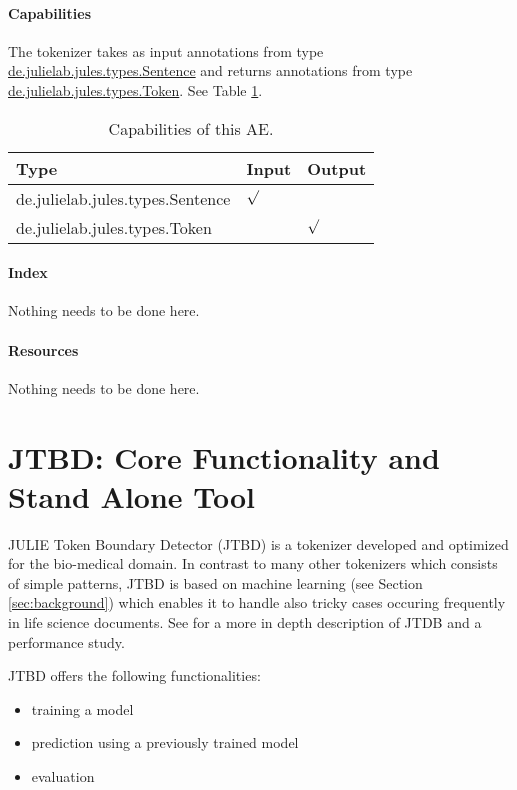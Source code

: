 \documentclass[11pt,a4paper,halfparskip]{scrartcl}
\begin{document}
\paragraph{Capabilities}
\label{sss:capabilities}
The tokenizer takes as input annotations from type \url{de.julielab.jules.types.Sentence} and returns annotations from type \url{de.julielab.jules.types.Token}. See Table \ref{tab:capabilities}.
\begin{table}[h!]
  \centering
  \begin{tabular}{|p{5cm}|p{2cm}|p{2cm}|}
    \hline
    Type & Input & Output \\
    \hline\hline
     de.julielab.jules.types.Sentence & $\surd$ & \\
      \hline
     de.julielab.jules.types.Token & &  $\surd$  \\
      \hline
  \end{tabular}
  \caption{Capabilities of this AE.}
  \label{tab:capabilities}
\end{table} 


\paragraph{Index}
Nothing needs to be done here.

\paragraph{Resources}
Nothing needs to be done here.



\clearpage
\section{JTBD: Core Functionality and Stand Alone Tool}
\label{sec_objective}


JULIE Token Boundary Detector (JTBD) is a tokenizer developed and
optimized for the bio-medical domain. In contrast to many other
tokenizers which consists of simple patterns, JTBD is based on machine
learning (see Section \ref{sec:background}) which enables it to handle
also tricky cases occuring frequently in life science documents. See
\cite{tomanek.medinfo07} for a more in depth description of JTDB and a
performance study.


JTBD offers the following functionalities:
\begin{itemize}
\item training a model
\item prediction using a previously trained model
\item evaluation
\end{itemize}
\end{document}
